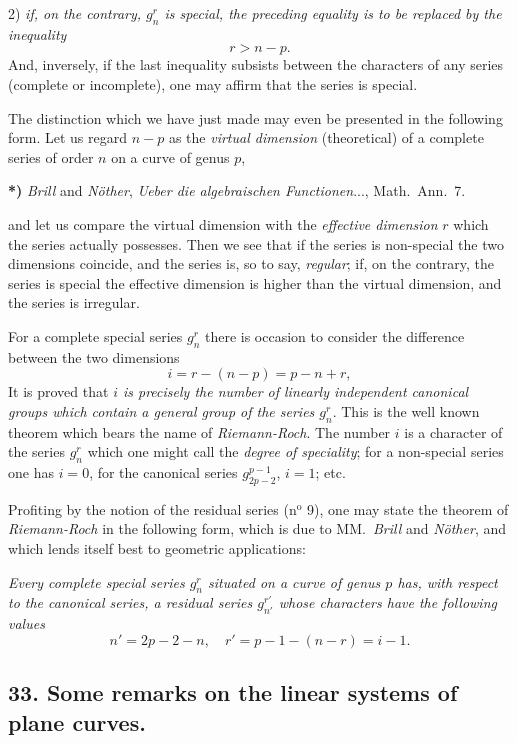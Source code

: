 \documentclass{article}
\begin{document}
2) \emph{if, on the contrary, $g_{n}^{r}$ is special, the preceding equality is to be replaced by the inequality}
\[ r > n - p. \]
And, inversely, if the last inequality subsists between the characters of any series (complete or incomplete), one may affirm that the series is special.

The distinction which we have just made may even be presented in the following form. Let us regard $n - p$ as the \emph{virtual dimension} (theoretical) of a complete series of order $n$ on a curve of genus $p$,

\textbf{*)} \emph{Brill} and \emph{Nöther}, \emph{Ueber die algebraischen Functionen}..., Math.\ Ann.\ 7.

and let us compare the virtual dimension with the \emph{effective dimension} $r$ which the series actually possesses. Then we see that if the series is non-special the two dimensions coincide, and the series is, so to say, \emph{regular}; if, on the contrary, the series is special the effective dimension is higher than the virtual dimension, and the series is irregular.

For a complete special series $g_{n}^{r}$ there is occasion to consider the difference between the two dimensions
\[ i = r - (n-p) = p - n + r, \]
It is proved that \emph{$i$ is precisely the number of linearly independent canonical groups which contain a general group of the series $g_{n}^{r}$}. This is the well known theorem which bears the name of \emph{Riemann-Roch}. The number $i$ is a character of the series $g_{n}^{r}$ which one might call the \emph{degree of speciality}; for a non-special series one has $i = 0$, for the canonical series $g_{2p-2}^{p-1}$, $i = 1$; etc.

Profiting by the notion of the residual series (n${}^{\text{o}}$ 9), one may state the theorem of \emph{Riemann-Roch} in the following form, which is due to MM.\ \emph{Brill} and \emph{Nöther}, and which lends itself best to geometric applications:

\emph{Every complete special series $g_{n}^{r}$ situated on a curve of genus $p$ has, with respect to the canonical series, a residual series $g_{n'}^{r'}$ whose characters have the following values}
\[ n' = 2p - 2 - n, \quad r' = p - 1 - (n-r) = i - 1. \]

\subsection*{33. Some remarks on the linear systems of plane curves.}
\end{document}
